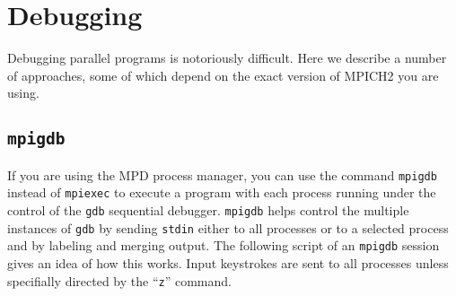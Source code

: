\documentclass[dvipdfm,11pt]{article}
\begin{document}
\section{Debugging}
\label{sec:debugging}

Debugging parallel programs is notoriously difficult.  Here we describe
a number of approaches, some of which depend on the exact version of
MPICH2 you are using. 


\subsection{\texttt{mpigdb}}
\label{sec:mpigdb}

If you are using the MPD process manager, you can use the command
\texttt{mpigdb} instead of \texttt{mpiexec} to execute a program with
each process running under the control of the \texttt{gdb} sequential
debugger.  \texttt{mpigdb} helps control the multiple instances of
\texttt{gdb} by sending \texttt{stdin} either to all processes or to a
selected process and by labeling and merging output.  The following
script of an \texttt{mpigdb} session gives an idea of how this works.
Input keystrokes are sent to all processes unless specifially directed
by the ``\texttt{z}'' command.
\end{document}
